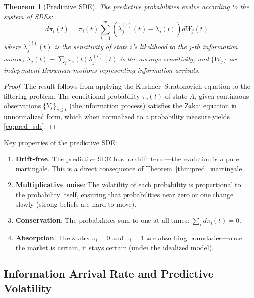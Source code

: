 \documentclass[12pt,a4paper]{article}
\newtheorem{theorem}{Theorem}[section]
\theoremstyle{definition}
\begin{document}
\begin{theorem}[Predictive SDE]\label{thm:pred_sde}
The predictive probabilities evolve according to the system of SDEs:
\begin{equation}\label{eq:pred_sde}
    d\pi_i(t) = \pi_i(t) \sum_{j=1}^{m} \left(\lambda_j^{(i)}(t) - \bar{\lambda}_j(t)\right) dW_j(t)
\end{equation}
where $\lambda_j^{(i)}(t)$ is the sensitivity of state $i$'s likelihood to the $j$-th information source, $\bar{\lambda}_j(t) = \sum_i \pi_i(t) \lambda_j^{(i)}(t)$ is the average sensitivity, and $\{W_j\}$ are independent Brownian motions representing information arrivals.
\end{theorem}

\begin{proof}
The result follows from applying the Kushner--Stratonovich equation to the filtering problem. The conditional probability $\pi_i(t)$ of state $A_i$ given continuous observations $\{Y_s\}_{s \leq t}$ (the information process) satisfies the Zakai equation in unnormalized form, which when normalized to a probability measure yields \eqref{eq:pred_sde}.
\end{proof}

Key properties of the predictive SDE:

\begin{enumerate}[label=(\roman*)]
    \item \textbf{Drift-free}: The predictive SDE has no drift term---the evolution is a pure martingale. This is a direct consequence of Theorem~\ref{thm:pred_martingale}.
    
    \item \textbf{Multiplicative noise}: The volatility of each probability is proportional to the probability itself, ensuring that probabilities near zero or one change slowly (strong beliefs are hard to move).
    
    \item \textbf{Conservation}: The probabilities sum to one at all times: $\sum_i d\pi_i(t) = 0$.
    
    \item \textbf{Absorption}: The states $\pi_i = 0$ and $\pi_i = 1$ are absorbing boundaries---once the market is certain, it stays certain (under the idealized model).
\end{enumerate}

\subsection{Information Arrival Rate and Predictive Volatility}
\end{document}
